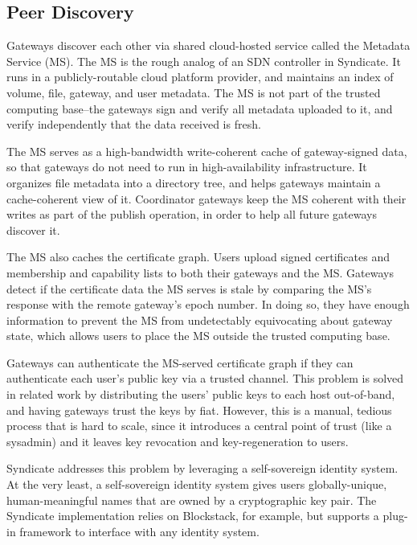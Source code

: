 \subsection{Peer Discovery}

Gateways discover each other via shared cloud-hosted service called the Metadata
Service (MS). The MS is the rough analog of an SDN controller in Syndicate. It
runs in a publicly-routable cloud platform provider, and maintains an index of
volume, file, gateway, and user metadata. The MS is not part of the trusted
computing base--the gateways sign and verify all metadata uploaded to it, and
verify independently that the data received is fresh.


The MS serves as a high-bandwidth write-coherent cache of gateway-signed data,
so that gateways do not need to run in high-availability infrastructure. It
organizes file metadata into a directory tree, and helps gateways maintain a
cache-coherent view of it. Coordinator gateways keep the MS coherent with their
writes as part of the publish operation, in order to help all future gateways
discover it.


The MS also caches the certificate graph. Users upload signed certificates and
membership and capability lists to both their gateways and the MS. Gateways
detect if the certificate data the MS serves is stale by comparing the MS's
response with the remote gateway's epoch number. In doing so, they have
enough information to prevent the MS from undetectably equivocating about
gateway state, which allows users to place the MS outside the trusted computing
base.


Gateways can authenticate the MS-served certificate graph if they can
authenticate each user's public key via a trusted channel. This problem is
solved in related work by distributing the users' public keys to
each host out-of-band, and having gateways trust the keys by fiat. However, this
is a manual, tedious process that is hard to scale, since it introduces a
central point of trust (like a sysadmin) and it leaves key revocation and
key-regeneration to users.

Syndicate addresses this problem by leveraging a self-sovereign identity system.
At the very least, a self-sovereign identity system gives users globally-unique, human-meaningful
names that are owned by a cryptographic key pair.  The Syndicate implementation
relies on Blockstack, for example, but supports a plug-in framework to interface
with any identity system.


